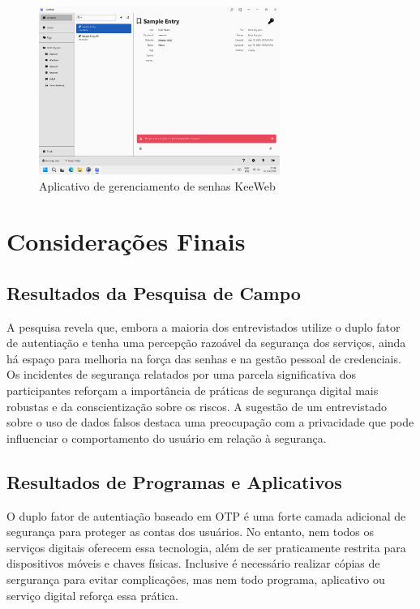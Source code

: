 \documentclass[12pt]{article}
\begin{document}
\begin{figure}[h!]
  \centering
  \includegraphics[width=0.7\textwidth]{./assets/keeweb.png}
  \caption{Aplicativo de gerenciamento de senhas KeeWeb}
  \label{fig:KeeWeb}
\end{figure}

\section{Considerações Finais}

\subsection{Resultados da Pesquisa de Campo}

A pesquisa revela que, embora a maioria dos entrevistados utilize o duplo fator de
autentiação e tenha uma percepção razoável da segurança dos serviços, ainda há
espaço para melhoria na força das senhas e na gestão pessoal de credenciais.
Os incidentes de segurança relatados por uma parcela significativa dos participantes
reforçam a importância de práticas de segurança digital mais robustas e da
conscientização sobre os riscos.
A sugestão de um entrevistado sobre o uso de dados falsos destaca uma preocupação
com a privacidade que pode influenciar o comportamento do usuário em relação à
segurança.

\subsection{Resultados de Programas e Aplicativos}

O duplo fator de autentiação baseado em OTP é uma forte camada adicional de segurança para
proteger as contas dos usuários.
No entanto, nem todos os serviços digitais oferecem essa tecnologia, além de ser praticamente
restrita para dispositivos móveis e chaves físicas.
Inclusive é necessário realizar cópias de sergurança para evitar complicações, mas nem todo
programa, aplicativo ou serviço digital reforça essa prática.
\end{document}
